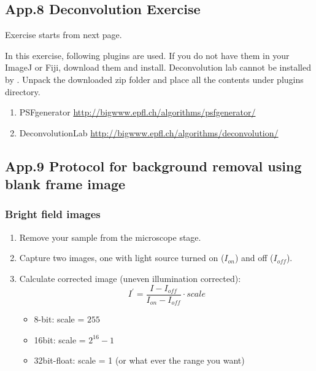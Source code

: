 
\clearpage

\subsection{App.8 Deconvolution Exercise}
\label{app8}

Exercise starts from next page. 

In this exercise, following plugins are used. If you do not have them in your
ImageJ or Fiji, download them and install. Deconvolution lab cannot be installed
by . Unpack the downloaded zip folder and place all
the contents under plugins directory.

\begin{enumerate}
	\item PSFgenerator \url{http://bigwww.epfl.ch/algorithms/psfgenerator/}
	\item DeconvolutionLab \url{http://bigwww.epfl.ch/algorithms/deconvolution/}
\end{enumerate}



\clearpage
\subsection{App.9 Protocol for background removal using blank frame image}
\label{app9}

\subsubsection{Bright field images}

\begin{enumerate}
\item Remove your sample from the microscope stage.
\item Capture two images, one with light source turned on ($I_{on}$) and off ($I_{off}$).
\item Calculate corrected image (uneven illumination corrected):
\[
I^{'}=\frac{I - I_{off}}{I_{on} - I_{off}}\cdot scale
\]
\begin{itemize}
\item 8-bit: scale = $255$
\item 16bit: scale = $2^{16}-1$
\item 32bit-float: scale = 1 (or what ever the range you want)
\end{itemize} 
\end{enumerate}

